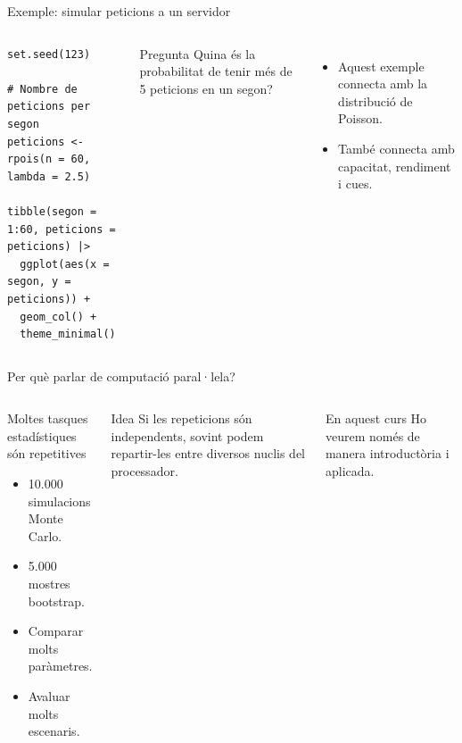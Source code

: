 \documentclass[10pt,aspectratio=169]{beamer}
\begin{document}
\begin{frame}[fragile]{Exemple: simular peticions a un servidor}
\begin{columns}[T]
\begin{lstlisting}
set.seed(123)

# Nombre de peticions per segon
peticions <- rpois(n = 60, lambda = 2.5)

tibble(segon = 1:60, peticions = peticions) |>
  ggplot(aes(x = segon, y = peticions)) +
  geom_col() +
  theme_minimal()
\end{lstlisting}

\begin{block}{Pregunta}
Quina és la probabilitat de tenir més de 5 peticions en un segon?
\end{block}

\begin{itemize}
  \item Aquest exemple connecta amb la distribució de Poisson.
  \item També connecta amb capacitat, rendiment i cues.
\end{itemize}
\end{columns}
\end{frame}

\begin{frame}{Per què parlar de computació paral·lela?}
\begin{columns}[T]
\begin{block}{Moltes tasques estadístiques són repetitives}
\begin{itemize}
  \item 10.000 simulacions Monte Carlo.
  \item 5.000 mostres bootstrap.
  \item Comparar molts paràmetres.
  \item Avaluar molts escenaris.
\end{itemize}
\end{block}

\begin{alertblock}{Idea}
Si les repeticions són independents, sovint podem repartir-les entre diversos nuclis del processador.
\end{alertblock}

\begin{block}{En aquest curs}
Ho veurem només de manera introductòria i aplicada.
\end{block}
\end{columns}
\end{frame}
\end{document}

